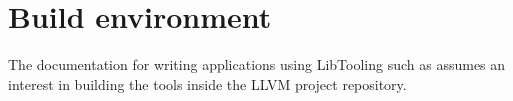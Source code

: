 \section{Build environment}

The documentation for writing applications using LibTooling such as \cite{MatchingClangAST, ClangTransformerTutorial} assumes an interest in building the tools inside the LLVM project repository.

